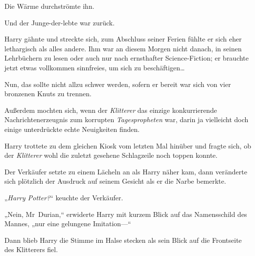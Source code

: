 Die Wärme durchströmte ihn.

Und der Junge-der-lebte war zurück.

Harry gähnte und streckte sich, zum Abschluss seiner Ferien fühlte er sich eher lethargisch als alles andere. Ihm war an diesem Morgen nicht danach, in seinen Lehrbüchern zu lesen oder auch nur nach ernsthafter Science-Fiction; er brauchte jetzt etwas vollkommen sinnfreies, um sich zu beschäftigen…

Nun, das sollte nicht allzu schwer werden, sofern er bereit war sich von vier bronzenen Knuts zu trennen.

Außerdem mochten sich, wenn der \emph{Klitterer} das einzige konkurrierende Nachrichtenerzeugnis zum korrupten \emph{Tagespropheten} war, darin ja vielleicht doch einige unterdrückte echte Neuigkeiten finden.

Harry trottete zu dem gleichen Kiosk vom letzten Mal hinüber und fragte sich, ob der \emph{Klitterer} wohl die zuletzt gesehene Schlagzeile noch toppen konnte.

Der Verkäufer setzte zu einem Lächeln an als Harry näher kam, dann veränderte sich plötzlich der Ausdruck auf seinem Gesicht als er die Narbe bemerkte.

„\emph{Harry Potter?}“ keuchte der Verkäufer.

„Nein, Mr~Durian,“ erwiderte Harry mit kurzem Blick auf das Namensschild des Mannes, „nur eine gelungene Imitation—“

Dann blieb Harry die Stimme im Halse stecken als sein Blick auf die Frontseite des Klitterers fiel.

